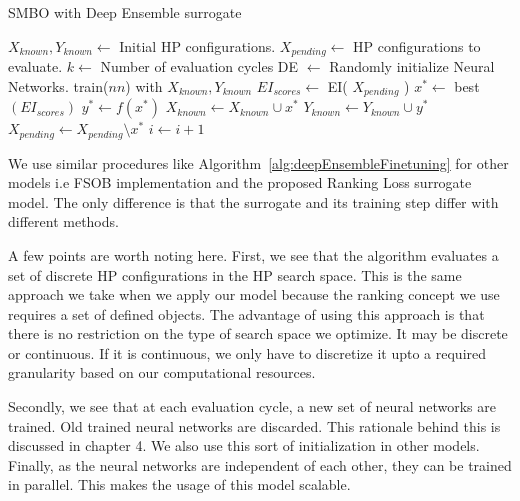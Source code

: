 \documentclass[12pt, twoside, ngerman]{report}
\begin{document}
\begin{algorithm}[H]
\caption{SMBO with Deep Ensemble surrogate}
\label{alg:deepEnsembleFinetuning}
\begin{algorithmic}
    \State $X_{known},  Y_{known} \gets$ Initial HP configurations.
    \State $X_{pending} \gets$ HP configurations to evaluate.
    \State $k \gets$ Number of evaluation cycles
        \State DE $\gets$ Randomly initialize Neural Networks. 
          
            \State train($nn$) with $X_{known},  Y_{known}$
        \EndFor
        \State $EI_{scores} \gets$ EI( $X_{pending}$ ) 
        \State $x^* \gets $ best $(EI_{scores})$
        \State $y^* \gets f(x^*)$ 
        \State $X_{known} \gets X_{known} \cup x^*$
        \State $Y_{known} \gets Y_{known} \cup y^*$
        \State $X_{pending} \gets X_{pending} \setminus x^*$ 
        \State $i \gets i + 1$
    \EndFor
    
\end{algorithmic}
\end{algorithm}

We use similar procedures like Algorithm~\ref{alg:deepEnsembleFinetuning} for other models i.e FSOB implementation and the proposed Ranking Loss surrogate model.
The only difference is that the surrogate and its training step differ with different methods.

A few points are worth noting here.
First,  we see that the algorithm evaluates a set of discrete HP configurations in the HP search space.
This is the same approach we take when we apply our model because the ranking concept we use requires a set of defined objects.
The advantage of using this approach is that there is no restriction on the type of search space we optimize.
It may be discrete or continuous.
If it is continuous,  we only have to discretize it upto a required granularity based on our computational resources.

Secondly,  we see that at each evaluation cycle,  a new set of neural networks are trained.
Old trained neural networks are discarded.
This rationale behind this is discussed in chapter 4.
We also use this sort of initialization in other models.
Finally,  as the neural networks are independent of each other,  they can be trained in parallel.
This makes the usage of this model scalable.
\end{document}
